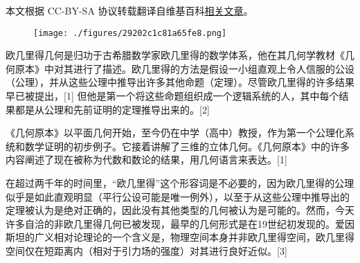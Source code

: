 
本文根据 CC-BY-SA 协议转载翻译自维基百科\href{https://en.wikipedia.org/wiki/Euclidean_geometry#}{相关文章}。

\begin{figure}[ht]
\centering
\texttt{[image: ./figures/29202c1c81a65fe8.png]}
\caption{} \label{fig_OJLJH_1}
\end{figure}
欧几里得几何是归功于古希腊数学家欧几里得的数学体系，他在其几何学教材《几何原本》中对其进行了描述。欧几里得的方法是假设一小组直观上令人信服的公设（公理），并从这些公理中推导出许多其他命题（定理）。尽管欧几里得的许多结果早已被提出，[1] 但他是第一个将这些命题组织成一个逻辑系统的人，其中每个结果都是从公理和先前证明的定理推导出来的。[2]

《几何原本》以平面几何开始，至今仍在中学（高中）教授，作为第一个公理化系统和数学证明的初步例子。它接着讲解了三维的立体几何。《几何原本》中的许多内容阐述了现在被称为代数和数论的结果，用几何语言来表达。[1]

在超过两千年的时间里，“欧几里得”这个形容词是不必要的，因为欧几里得的公理似乎是如此直观明显（平行公设可能是唯一例外），以至于从这些公理中推导出的定理被认为是绝对正确的，因此没有其他类型的几何被认为是可能的。然而，今天许多自洽的非欧几里得几何已被发现，最早的几何形式是在19世纪初发现的。爱因斯坦的广义相对论理论的一个含义是，物理空间本身并非欧几里得空间，欧几里得空间仅在短距离内（相对于引力场的强度）对其进行良好近似。[3]
